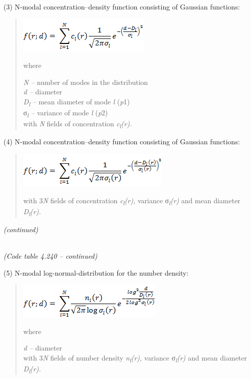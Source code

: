 (3) N-modal concentration--density function consisting of Gaussian functions:

\begin{quote}
\includegraphics{../tex/extracted-media/media/image15.png}

where

\emph{N --} number of modes in the distribution\\
\emph{d --} diameter\\
\emph{D\textsubscript{l} --} mean diameter of mode \emph{l} (\emph{p}1)\\
σ\emph{\textsubscript{l} --} variance of mode \emph{l} (\emph{p}2)\\
with \emph{N} fields of concentration \emph{c\textsubscript{l}(r).}
\end{quote}

(4) N-modal concentration--density function consisting of Gaussian functions:

\begin{quote}
\includegraphics{../tex/extracted-media/media/image16.png}

with 3\emph{N} fields of concentration \emph{c\textsubscript{l}(r),} variance σ\emph{\textsubscript{l}(r)} and mean diameter \emph{D\textsubscript{l}(r).}
\end{quote}

\emph{(continued)}

\emph{\\
(Code table 4.240 -- continued)}

(5) N-modal log-normal-distribution for the number density:

\begin{quote}
\includegraphics{../tex/extracted-media/media/image17.png}

where

\emph{d --} diameter\\
with 3\emph{N} fields of number density \emph{n\textsubscript{l}(r),} variance σ\emph{\textsubscript{l}(r)} and mean diameter \emph{D\textsubscript{l}(r).}
\end{quote}

